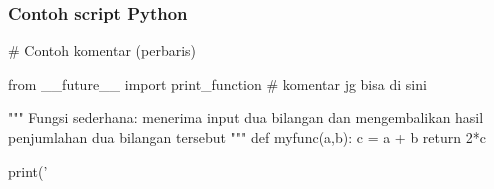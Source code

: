 \documentclass[bahasa,10pt]{beamer}
\begin{document}
\begin{frame}[fragile]
\frametitle{Contoh script Python}

\begin{pythoncode}
# Contoh komentar (perbaris)

from __future__ import print_function # komentar jg bisa di sini

"""
Fungsi sederhana: menerima input dua bilangan dan mengembalikan
hasil penjumlahan dua bilangan tersebut
"""
def myfunc(a,b):
    c = a + b
    return 2*c

print('%
\end{pythoncode}


\end{frame}
\end{document}
